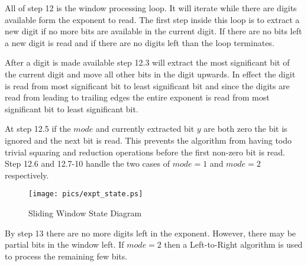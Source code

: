 \documentclass[b5paper]{book}
\begin{document}
All of step 12 is the window processing loop.  It will iterate while there are digits available form the exponent to read.  The first step
inside this loop is to extract a new digit if no more bits are available in the current digit.  If there are no bits left a new digit is
read and if there are no digits left than the loop terminates.  

After a digit is made available step 12.3 will extract the most significant bit of the current digit and move all other bits in the digit
upwards.  In effect the digit is read from most significant bit to least significant bit and since the digits are read from leading to 
trailing edges the entire exponent is read from most significant bit to least significant bit.

At step 12.5 if the $mode$ and currently extracted bit $y$ are both zero the bit is ignored and the next bit is read.  This prevents the 
algorithm from having todo trivial squaring and reduction operations before the first non-zero bit is read.  Step 12.6 and 12.7-10 handle
the two cases of $mode = 1$ and $mode = 2$ respectively.  

\begin{center}
\begin{figure}[here]
\texttt{[image: pics/expt\_state.ps]}
\caption{Sliding Window State Diagram}
\end{figure}
\end{center}

By step 13 there are no more digits left in the exponent.  However, there may be partial bits in the window left.  If $mode = 2$ then 
a Left-to-Right algorithm is used to process the remaining few bits.  
\end{document}
